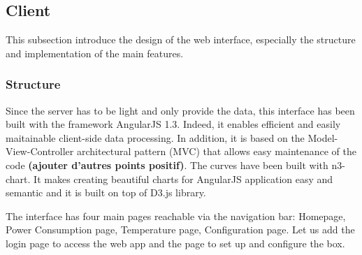 \subsection{Client} %

This subsection introduce the design of the web interface, especially the structure and implementation of the main features.

\subsubsection{Structure}
    Since the server has to be light and only provide the data, this interface has been built with the framework AngularJS 1.3. Indeed, it enables efficient and easily maitainable client-side data processing. In addition, it is based on the Model-View-Controller architectural pattern (MVC) that allows easy maintenance of the code \textbf{(ajouter d'autres points positif)}. The curves have been built with n3-chart. It makes creating beautiful charts for AngularJS application easy and semantic and it is built on top of D3.js library.
    
    The interface has four main pages reachable via the navigation bar: Homepage, Power Consumption page, Temperature page, Configuration page. Let us add the login page to access the web app and the page to set up and configure the box.
     
    \begin{figure}[!h]
        \centering
    \end{figure}

